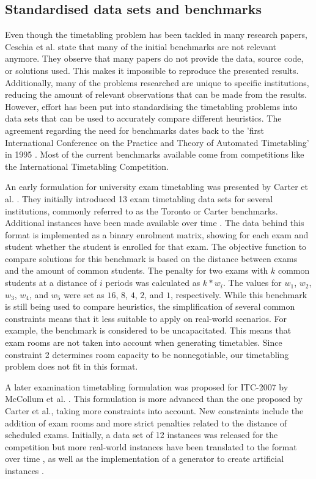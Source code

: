 \subsection{Standardised data sets and benchmarks} \label{benchmarks}

Even though the timetabling problem has been tackled in many research papers, Ceschia et al.\cite{ceschia2022} state that many of the initial benchmarks are not relevant anymore. They observe that many papers do not provide the data, source code, or solutions used. This makes it impossible to reproduce the presented results. Additionally, many of the problems researched are unique to specific institutions, reducing the amount of relevant observations that can be made from the results. However, effort has been put into standardising the timetabling problems into data sets that can be used to accurately compare different heuristics. The agreement regarding the need for benchmarks dates back to the 'first International Conference on the Practice and Theory of Automated Timetabling' in 1995 \cite{cumming1995}. Most of the current benchmarks available come from competitions like the International Timetabling Competition.

An early formulation for university exam timetabling was presented by Carter et al. \cite{carter1996}. They initially introduced 13 exam timetabling data sets for several institutions, commonly referred to as the Toronto or Carter benchmarks. Additional instances have been made available over time \cite{bellio2021}. The data behind this format is implemented as a binary enrolment matrix, showing for each exam and student whether the student is enrolled for that exam. The objective function to compare solutions for this benchmark is based on the distance between exams and the amount of common students. The penalty for two exams with $k$ common students at a distance of $i$ periods was calculated as $k*w_{i}$. The values for $w_1$, $w_2$, $w_3$, $w_4$, and $w_5$ were set as $16$, $8$, $4$, $2$, and $1$, respectively. While this benchmark is still being used to compare heuristics, the simplification of several common constraints means that it less suitable to apply on real-world scenarios. For example, the benchmark is considered to be uncapacitated. This means that exam rooms are not taken into account when generating timetables. Since constraint 2 determines room capacity to be nonnegotiable, our timetabling problem does not fit in this format.

A later examination timetabling formulation was proposed for ITC-2007 by McCollum et al. \cite{mccollum2007}. This formulation is more advanced than the one proposed by Carter et al., taking more constraints into account. New constraints include the addition of exam rooms and more strict penalties related to the distance of scheduled exams. Initially, a data set of 12 instances was released for the competition but more real-world instances have been translated to the format over time \cite{parkes2010}, as well as the implementation of a generator to create artificial instances \cite{battistutta2017}.

